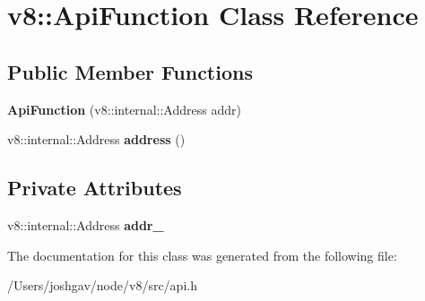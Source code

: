 \hypertarget{classv8_1_1_api_function}{}\section{v8\+:\+:Api\+Function Class Reference}
\label{classv8_1_1_api_function}
\subsection*{Public Member Functions}
\begin{DoxyCompactItemize}
\item 
{\bfseries Api\+Function} (v8\+::internal\+::\+Address addr)\hypertarget{classv8_1_1_api_function_a711c062e7328b2cd864a755290ccc70c}{}\label{classv8_1_1_api_function_a711c062e7328b2cd864a755290ccc70c}

\item 
v8\+::internal\+::\+Address {\bfseries address} ()\hypertarget{classv8_1_1_api_function_ae3168a2d34c3c799c4aae32a9c3bdba2}{}\label{classv8_1_1_api_function_ae3168a2d34c3c799c4aae32a9c3bdba2}

\end{DoxyCompactItemize}
\subsection*{Private Attributes}
\begin{DoxyCompactItemize}
\item 
v8\+::internal\+::\+Address {\bfseries addr\+\_\+}\hypertarget{classv8_1_1_api_function_af919d8ecbe8f85c017fc4f311327980f}{}\label{classv8_1_1_api_function_af919d8ecbe8f85c017fc4f311327980f}

\end{DoxyCompactItemize}


The documentation for this class was generated from the following file\+:\begin{DoxyCompactItemize}
\item 
/\+Users/joshgav/node/v8/src/api.\+h\end{DoxyCompactItemize}
